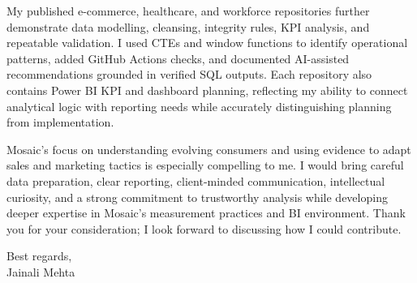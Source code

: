 \documentclass[letterpaper,11pt]{article}
\begin{document}
\bigbreak
My published e-commerce, healthcare, and workforce repositories further demonstrate data modelling, cleansing, integrity rules, KPI analysis, and repeatable validation. I used CTEs and window functions to identify operational patterns, added GitHub Actions checks, and documented AI-assisted recommendations grounded in verified SQL outputs. Each repository also contains Power BI KPI and dashboard planning, reflecting my ability to connect analytical logic with reporting needs while accurately distinguishing planning from implementation.

\bigbreak
Mosaic's focus on understanding evolving consumers and using evidence to adapt sales and marketing tactics is especially compelling to me. I would bring careful data preparation, clear reporting, client-minded communication, intellectual curiosity, and a strong commitment to trustworthy analysis while developing deeper expertise in Mosaic's measurement practices and BI environment. Thank you for your consideration; I look forward to discussing how I could contribute.

\bigbreak
Best regards,\\
Jainali Mehta
\end{document}
